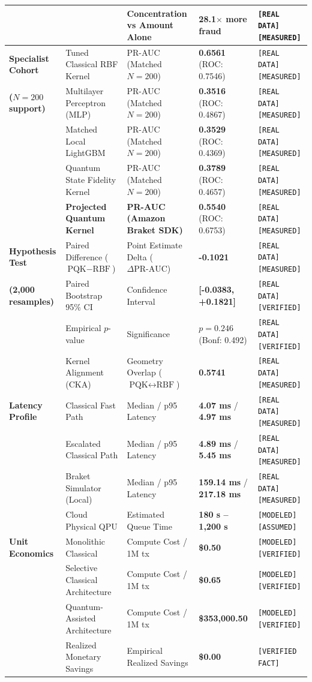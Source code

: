 \documentclass[10pt,a4paper]{article}
\begin{document}
\begin{table}[h!]
\begin{tabularx}{\linewidth}{@{}p{2.3cm}Xp{2.7cm}p{2.1cm}>{\raggedright\arraybackslash\tiny}p{2.1cm}@{}}
& & Concentration vs Amount Alone & \textbf{28.1$\times$ more fraud} & \texttt{[REAL DATA][MEASURED]} \\
\midrule
\textbf{Specialist Cohort} & Tuned Classical RBF Kernel & PR-AUC (Matched $N=200$) & \textbf{0.6561} (ROC: 0.7546) & \texttt{[REAL DATA][MEASURED]} \\
\textbf{($N=200$ support)} & Multilayer Perceptron (MLP) & PR-AUC (Matched $N=200$) & \textbf{0.3516} (ROC: 0.4867) & \texttt{[REAL DATA][MEASURED]} \\
& Matched Local LightGBM & PR-AUC (Matched $N=200$) & \textbf{0.3529} (ROC: 0.4369) & \texttt{[REAL DATA][MEASURED]} \\
& Quantum State Fidelity Kernel & PR-AUC (Matched $N=200$) & \textbf{0.3789} (ROC: 0.4657) & \texttt{[REAL DATA][MEASURED]} \\
& \textbf{Projected Quantum Kernel} & \textbf{PR-AUC (Amazon Braket SDK)} & \textbf{0.5540} (ROC: 0.6753) & \texttt{[REAL DATA][MEASURED]} \\
\midrule
\textbf{Hypothesis Test} & Paired Difference ($\text{PQK} - \text{RBF}$) & Point Estimate Delta ($\Delta\text{PR-AUC}$) & \textbf{-0.1021} & \texttt{[REAL DATA][MEASURED]} \\
\textbf{(2,000 resamples)} & Paired Bootstrap 95\% CI & Confidence Interval & \textbf{[-0.0383, +0.1821]} & \texttt{[REAL DATA][VERIFIED]} \\
& Empirical $p$-value & Significance & \textbf{$p = 0.246$} (Bonf: 0.492) & \texttt{[REAL DATA][VERIFIED]} \\
& Kernel Alignment (CKA) & Geometry Overlap ($\text{PQK} \leftrightarrow \text{RBF}$) & \textbf{0.5741} & \texttt{[REAL DATA][MEASURED]} \\
\midrule
\textbf{Latency Profile} & Classical Fast Path & Median / p95 Latency & \textbf{4.07 ms} / \textbf{4.97 ms} & \texttt{[REAL DATA][MEASURED]} \\
& Escalated Classical Path & Median / p95 Latency & \textbf{4.89 ms} / \textbf{5.45 ms} & \texttt{[REAL DATA][MEASURED]} \\
& Braket Simulator (Local) & Median / p95 Latency & \textbf{159.14 ms} / \textbf{217.18 ms} & \texttt{[REAL DATA][MEASURED]} \\
& Cloud Physical QPU & Estimated Queue Time & \textbf{180 s -- 1,200 s} & \texttt{[MODELED][ASSUMED]} \\
\midrule
\textbf{Unit Economics} & Monolithic Classical & Compute Cost / 1M tx & \textbf{\$0.50} & \texttt{[MODELED][VERIFIED]} \\
& Selective Classical Architecture & Compute Cost / 1M tx & \textbf{\$0.65} & \texttt{[MODELED][VERIFIED]} \\
& Quantum-Assisted Architecture & Compute Cost / 1M tx & \textbf{\$353,000.50} & \texttt{[MODELED][VERIFIED]} \\
& Realized Monetary Savings & Empirical Realized Savings & \textbf{\$0.00} & \texttt{[VERIFIED FACT]} \\
\bottomrule
\end{tabularx}
\end{table}
\end{document}
